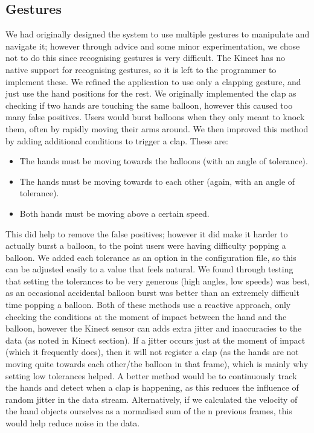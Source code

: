 \subsection{Gestures}
We had originally designed the system to use multiple gestures to manipulate and navigate it; however through advice and some minor experimentation, we chose not to do this since recognising gestures is very difficult. The Kinect has no native support for recognising gestures, so it is left to the programmer to implement these. We refined the application to use only a clapping gesture, and just use the hand positions for the rest.
We originally implemented the clap as checking if two hands are touching the same balloon, however this caused too many false positives. Users would burst balloons when they only meant to knock them, often by rapidly moving their arms around.
We then improved this method by adding additional conditions to trigger a clap. These are:
\begin{itemize}
\item{The hands must be moving towards the balloons (with an angle of tolerance).}
\item{The hands must be moving towards to each other (again, with an angle of tolerance).}
\item{Both hands must be moving above a certain speed.}
\end{itemize}
This did help to remove the false positives; however it did make it harder to actually burst a balloon, to the point users were having difficulty popping a balloon. We added each tolerance as an option in the configuration file, so this can be adjusted easily to a value that feels natural. We found through testing that setting the tolerances to be very generous (high angles, low speeds) was best, as an occasional accidental balloon burst was better than an extremely difficult time popping a balloon.
Both of these methods use a reactive approach, only checking the conditions at the moment of impact between the hand and the balloon, however the Kinect sensor can adds extra jitter and inaccuracies to the data (as noted in Kinect section). If a jitter occurs just at the moment of impact (which it frequently does), then it will not register a clap (as the hands are not moving quite towards each other/the balloon in that frame), which is mainly why setting low tolerances helped.
A better method would be to continuously track the hands and detect when a clap is happening, as this reduces the influence of random jitter in the data stream. Alternatively, if we calculated the velocity of the hand objects ourselves as a normalised sum of the n previous frames, this would help reduce noise in the data.
 
